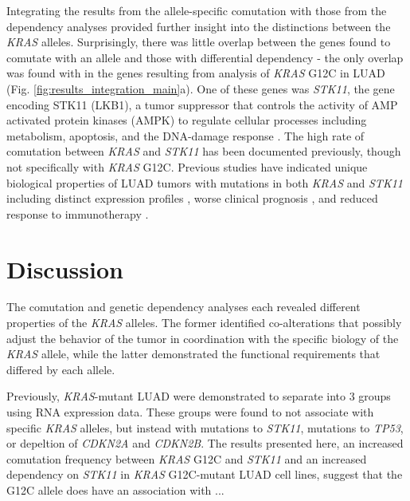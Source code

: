 \documentclass[english, 12pt, letterpaper]{article}
\newcommand{\KRAS}{\emph{KRAS}}
\begin{document}
Integrating the results from the allele-specific comutation with those from the dependency analyses provided further insight into the distinctions between the \KRAS{} alleles.
Surprisingly, there was little overlap between the genes found to comutate with an allele and those with differential dependency - the only overlap was found with in the genes resulting from analysis of \KRAS{} G12C in LUAD (Fig. \ref{fig:results_integration_main}a).
One of these genes was \emph{STK11}, the gene encoding STK11 (LKB1), a tumor suppressor that controls the activity of AMP activated protein kinases (AMPK) to regulate cellular processes including metabolism, apoptosis, and the DNA-damage response \cite{Momcilovic2015TargetingVulnerabilities., Korsse2013TargetingCancer.}.
The high rate of comutation between \KRAS{} and \emph{STK11} has been documented previously, though not specifically with \KRAS{} G12C.
Previous studies have indicated unique biological properties of LUAD tumors with mutations in both \KRAS{} and \emph{STK11} including distinct expression profiles \cite{Skoulidis2015Co-occurringVulnerabilities.}, worse clinical prognosis \cite{LaFleur2019MutationSTK11, Bange2019ImpactCancer.}, and reduced response to immunotherapy \cite{Skoulidis2018STK11/LKB1Adenocarcinoma.}.




\section*{Discussion}


The comutation and genetic dependency analyses each revealed different properties of the \KRAS{} alleles.
The former identified co-alterations that possibly adjust the behavior of the tumor in coordination with the specific biology of the \KRAS{} allele, while the latter demonstrated the functional requirements that differed by each allele.

Previously, \KRAS{}-mutant LUAD were demonstrated to separate into 3 groups using RNA expression data.
These groups were found to not associate with specific \KRAS{} alleles, but instead with mutations to \emph{STK11}, mutations to \emph{TP53}, or depeltion of \emph{CDKN2A} and \emph{CDKN2B}.
The results presented here, an increased comutation frequency between \KRAS{} G12C and \emph{STK11} and an increased dependency on \emph{STK11} in \KRAS{} G12C-mutant LUAD cell lines, suggest that the G12C allele does have an association with ...
\end{document}
